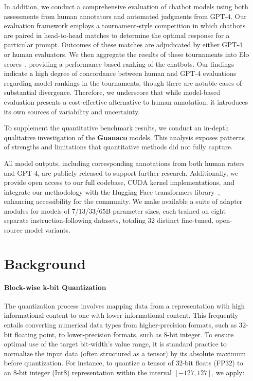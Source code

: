 In addition, we conduct a comprehensive evaluation of chatbot models using both assessments from human annotators and automated judgments from GPT-4. Our evaluation framework employs a tournament-style competition in which chatbots are paired in head-to-head matches to determine the optimal response for a particular prompt. Outcomes of these matches are adjudicated by either GPT-4 or human evaluators. We then aggregate the results of these tournaments into Elo scores~\citep{elo1967proposed, elo1978rating}, providing a performance-based ranking of the chatbots. Our findings indicate a high degree of concordance between human and GPT-4 evaluations regarding model rankings in the tournaments, though there are notable cases of substantial divergence. Therefore, we underscore that while model-based evaluation presents a cost-effective alternative to human annotation, it introduces its own sources of variability and uncertainty.

To supplement the quantitative benchmark results, we conduct an in-depth qualitative investigation of the \textbf{Guanaco} models. This analysis exposes patterns of strengths and limitations that quantitative methods did not fully capture.

All model outputs, including corresponding annotations from both human raters and GPT-4, are publicly released to support further research. Additionally, we provide open access to our full codebase, CUDA kernel implementations, and integrate our methodology with the Hugging Face transformers library~\citep{wolf2019huggingface}, enhancing accessibility for the community. We make available a suite of adapter modules for models of 7/13/33/65B parameter sizes, each trained on eight separate instruction-following datasets, totaling 32 distinct fine-tuned, open-source model variants.

\section{Background}
\paragraph{Block-wise k-bit Quantization} The quantization process involves mapping data from a representation with high informational content to one with lower informational content. This frequently entails converting numerical data types from higher-precision formats, such as 32-bit floating point, to lower-precision formats, such as 8-bit integer. To ensure optimal use of the target bit-width's value range, it is standard practice to normalize the input data (often structured as a tensor) by its absolute maximum before quantization. For instance, to quantize a tensor of 32-bit floats (FP32) to an 8-bit integer (Int8) representation within the interval $[-127, 127]$, we apply:

